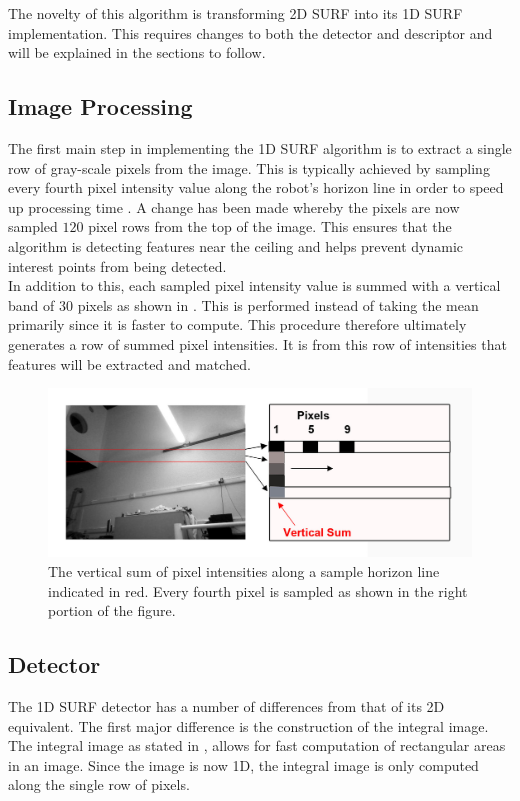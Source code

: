 \documentclass[11pt]{report}
\begin{document}
The novelty of this algorithm is transforming 2D SURF into its 1D SURF implementation. This requires changes to both the detector and descriptor and will be explained in the sections to follow.\\

\subsection{Image Processing}
\label{sec:imageProcessing}
The first main step in implementing the 1D SURF algorithm is to extract a single row of gray-scale pixels from the image. This is typically achieved by sampling every fourth pixel intensity value along the robot's horizon line \cite{Bhuman} in order to speed up processing time \cite{Anderson}. A change has been made whereby the pixels are now sampled $120$ pixel rows from the top of the image. This ensures that the algorithm is detecting features near the ceiling and helps prevent dynamic interest points from being detected.\\

In addition to this, each sampled pixel intensity value is summed with a vertical band of $30$ pixels as shown in . This is performed instead of taking the mean primarily since it is faster to compute. This procedure therefore ultimately generates a row of summed pixel intensities. It is from this row of intensities that features will be extracted and matched.\\

\begin{figure}[h!] 
  \centering
    \includegraphics[width=1.0\textwidth]{../Drawings/methods/horizon.jpg}
    \caption{The vertical sum of pixel intensities along a sample horizon line indicated in red. Every fourth pixel is sampled as shown in the right portion of the figure. }
    \label{fig:rows}
\end{figure}

\subsection{Detector}
\label{sec:1dsurfDetect}
The 1D SURF detector has a number of differences from that of its 2D equivalent. The first major difference is the construction of the integral image. The integral image as stated in , allows for fast computation of rectangular areas in an image. Since the image is now 1D, the integral image is only computed along the single row of pixels.\\ 
\end{document}
